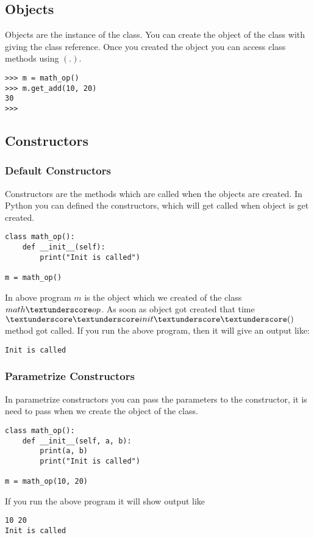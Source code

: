 \documentclass[letterpaper,12pt]{book}
\begin{document}
\subsection{Objects}
Objects are the instance of the class. You can create the object of the class with giving the class reference. Once you created the object you can access class methods using $(.)$.

\begin{verbatim}
>>> m = math_op()
>>> m.get_add(10, 20)
30
>>>
\end{verbatim}
\subsection{Constructors}
\subsubsection{Default Constructors}
Constructors are the methods which are called when the objects are created. In Python you can defined the constructors, which will get called when object is get created.

\begin{verbatim}
class math_op():
    def __init__(self):
        print("Init is called")

m = math_op()
\end{verbatim}
In above program $m$ is the object which we created of the class $math \textunderscore op$. As soon as object got created that time $\textunderscore\textunderscore init\textunderscore\textunderscore()$ method got called. 
If you run the above program, then it will give an output like:
\begin{verbatim}
Init is called
\end{verbatim}
\subsubsection{Parametrize Constructors}
In parametrize constructors you can pass the parameters to the constructor, it is need to pass when we create the object of the class.

\begin{verbatim}
class math_op():
    def __init__(self, a, b):
        print(a, b)
        print("Init is called")
		
m = math_op(10, 20)
\end{verbatim}
If you run the above program it will show output like
\begin{verbatim}
10 20
Init is called
\end{verbatim}
\end{document}
